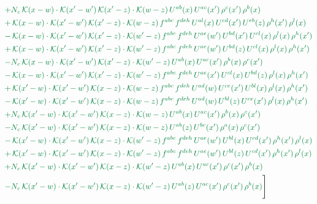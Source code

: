 \documentclass[10pt]{article}
\numberwithin{equation}{section}
\begin{document}
\begin{align}
&{\color{JIM} +N_{c}\,\mathcal{K}(x-w)\cdot\mathcal{K}(x'-w')\,\mathcal{K}(x'-z)\cdot\mathcal{K}(w-z)\,U^{ab}(x)\,U^{ac}(x')\,\rho^{c}(x')\,\rho^{b}(x)} \notag\\
&{\color{JIM} +\,\mathcal{K}(x-w)\cdot\mathcal{K}(x'-w')\,\mathcal{K}(x'-z)\cdot\mathcal{K}(w-z)\,f^{abc}\,f^{deh}\,U^{al}(x)\,U^{cd}(x')\,U^{eb}(z)\,\rho^{h}(x')\,\rho^{l}(x)} \notag\\
&{\color{JIM} -\,\mathcal{K}(x-w)\cdot\mathcal{K}(x'-w')\,\mathcal{K}(x'-z)\cdot\mathcal{K}(w'-z)\,f^{abc}\,f^{deh}\,U^{ae}(w')\,U^{bd}(x')\,U^{cl}(x)\,\rho^{l}(x)\,\rho^{h}(x')} \notag\\
&{\color{JIM} +\,\mathcal{K}(x-w)\cdot\mathcal{K}(x'-w')\,\mathcal{K}(x'-z)\cdot\mathcal{K}(w'-z)\,f^{abc}\,f^{deh}\,U^{ae}(w')\,U^{bd}(z)\,U^{cl}(x)\,\rho^{l}(x)\,\rho^{h}(x')} \notag\\
&{\color{JIM} -N_{c}\,\mathcal{K}(x-w)\cdot\mathcal{K}(x'-w')\,\mathcal{K}(x'-z)\cdot\mathcal{K}(w'-z)\,U^{ab}(x)\,U^{ac}(x')\,\rho^{b}(x)\,\rho^{c}(x')} \notag\\
&{\color{JIM} -\,\mathcal{K}(x-w)\cdot\mathcal{K}(x'-w')\,\mathcal{K}(x'-z)\cdot\mathcal{K}(w'-z)\,f^{abc}\,f^{deh}\,U^{ae}(x')\,U^{cl}(x)\,U^{bd}(z)\,\rho^{l}(x)\,\rho^{h}(x')} \notag\\
&{\color{JIM} +\,\mathcal{K}(x'-w)\cdot\mathcal{K}(x'-w')\,\mathcal{K}(x-z)\cdot\mathcal{K}(w-z)\,f^{abc}\,f^{deh}\,U^{ad}(w)\,U^{ce}(x')\,U^{bl}(x)\,\rho^{l}(x)\,\rho^{h}(x')} \notag\\
&{\color{JIM} -\,\mathcal{K}(x'-w)\cdot\mathcal{K}(x'-w')\,\mathcal{K}(x-z)\cdot\mathcal{K}(w-z)\,f^{abc}\,f^{deh}\,U^{ad}(w)\,U^{bl}(z)\,U^{ce}(x')\,\rho^{l}(x)\,\rho^{h}(x')} \notag\\
&{\color{JIM} +N_{c}\,\mathcal{K}(x'-w)\cdot\mathcal{K}(x'-w')\,\mathcal{K}(x-z)\cdot\mathcal{K}(w-z)\,U^{ab}(x)\,U^{ac}(x')\,\rho^{b}(x)\,\rho^{c}(x')} \notag\\
&{\color{JIM} -N_{c}\,\mathcal{K}(x'-w)\cdot\mathcal{K}(x'-w')\,\mathcal{K}(x-z)\cdot\mathcal{K}(w-z)\,U^{ab}(z)\,U^{bc}(x')\,\rho^{a}(x)\,\rho^{c}(x')} \notag\\
&{\color{JIM} -\,\mathcal{K}(x'-w)\cdot\mathcal{K}(x'-w')\,\mathcal{K}(x-z)\cdot\mathcal{K}(w'-z)\,f^{abc}\,f^{deh}\,U^{ae}(w')\,U^{bl}(x)\,U^{cd}(x')\,\rho^{h}(x')\,\rho^{l}(x)} \notag\\
&{\color{JIM} +\,\mathcal{K}(x'-w)\cdot\mathcal{K}(x'-w')\,\mathcal{K}(x-z)\cdot\mathcal{K}(w'-z)\,f^{abc}\,f^{deh}\,U^{ae}(w')\,U^{bl}(z)\,U^{cd}(x')\,\rho^{h}(x')\,\rho^{l}(x)} \notag\\
&{\color{JIM} +N_{c}\,\mathcal{K}(x'-w)\cdot\mathcal{K}(x'-w')\,\mathcal{K}(x-z)\cdot\mathcal{K}(w'-z)\,U^{ab}(x)\,U^{ac}(x')\,\rho^{c}(x')\,\rho^{b}(x)} \notag\\
&{\color{JIM} -N_{c}\,\mathcal{K}(x'-w)\cdot\mathcal{K}(x'-w')\,\mathcal{K}(x-z)\cdot\mathcal{K}(w'-z)\,U^{ab}(z)\,U^{ac}(x')\,\rho^{c}(x')\,\rho^{b}(x)}\Bigg] \end{align}
\end{document}

